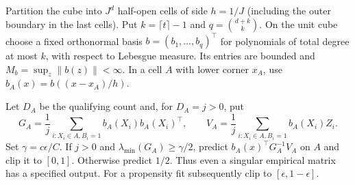 \documentclass[11pt]{article}
\theoremstyle{remark}
\begin{document}
Partition the cube into $J^d$ half-open cells of side $h=1/J$ (including
the outer boundary in the last cells). Put $k=\lceil t\rceil-1$ and
$q=\binom{d+k}{k}$. On the unit cube choose a fixed orthonormal basis
$b=(b_1,\ldots,b_q)^\top$ for polynomials of total degree at most $k$,
with respect to Lebesgue measure. Its entries are bounded and
$M_b=\sup_z\|b(z)\|<\infty$. In a cell $A$ with lower corner $x_A$,
use $b_A(x)=b((x-x_A)/h)$.

Let $D_A$ be the qualifying count and, for $D_A=j>0$, put
\[
 G_A=\frac1j\sum_{i:X_i\in A,B_i=1}b_A(X_i)b_A(X_i)^\top,
 \qquad
 V_A=\frac1j\sum_{i:X_i\in A,B_i=1}b_A(X_i)Z_i.
\]
Set $\gamma=c\epsilon/C$. If $j>0$ and
$\lambda_{\min}(G_A)\ge\gamma/2$, predict
$b_A(x)^\top G_A^{-1}V_A$ on $A$ and clip it to $[0,1]$.
Otherwise predict $1/2$. Thus even a singular empirical matrix has a
specified output. For a propensity fit subsequently clip to
$[\epsilon,1-\epsilon]$.
\end{document}
